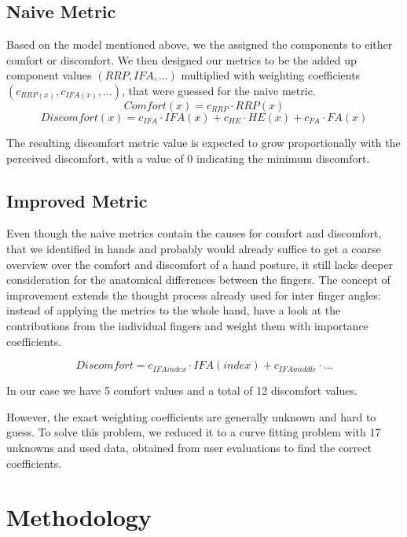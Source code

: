 \documentclass{sig-alternate-05-2015}
\begin{document}
\subsection{Naive Metric}


Based on the model mentioned above, we the assigned the components to either comfort or discomfort. We then designed our metrics to be the added up component values \begin{math}(RRP, IFA, ...)\end{math} multiplied with weighting coefficients \begin{math}(c_{RRP(x)}, c_{IFA(x)}, ...)\end{math}, that were guessed for the naive metric.
	\[
	Comfort(x) = c_{RRP}\cdot RRP(x)
	\]
	\[
	Discomfort(x) = c_{IFA}\cdot IFA(x)  +  c_{HE}\cdot HE(x)  +  c_{FA}\cdot FA(x)
	\]

The resulting discomfort metric value is expected to grow proportionally with the perceived discomfort, with a value of 0 indicating the minimum discomfort. 

\subsection{Improved Metric}

Even though the naive metrics contain the causes for comfort and discomfort, that we identified in hands and probably would already suffice to get a coarse overview over the comfort and discomfort of a hand posture, it still lacks deeper consideration for the anatomical differences between the fingers.
The concept of improvement extends the thought process already used for inter finger angles: instead of applying the metrics to the whole hand, have a look at the contributions from the individual fingers and weight them with importance coefficients. 

	\[
	Discomfort = c_{IFAindex}\cdot IFA(index)  +  c_{IFAmiddle}\cdot...
	\]

In our case we have 5 comfort values and a total of 12 discomfort values. 

However, the exact weighting coefficients are generally unknown and hard to guess. To solve this problem, we reduced it to a curve fitting problem with 17 unknowns and used data, obtained from user evaluations to find the correct coefficients.

\section{Methodology}
\end{document}
